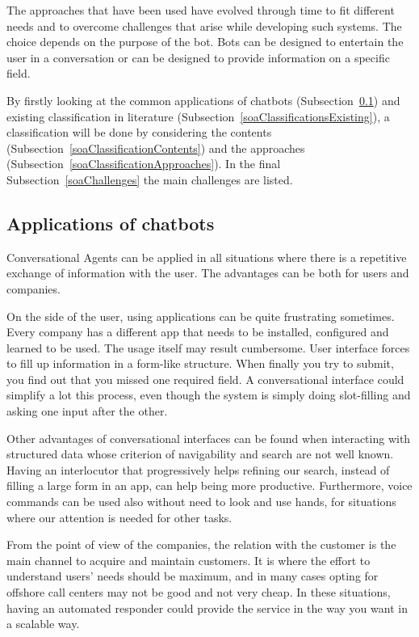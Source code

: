 The approaches that have been used have evolved through time to fit different needs and to overcome challenges that arise while developing such systems. The choice depends on the purpose of the bot. Bots can be designed to entertain the user in a conversation or can be designed to provide information on a specific field.

By firstly looking at the common applications of chatbots (Subsection~\ref{soaApplications}) and existing classification in literature (Subsection~\ref{soaClassificationsExisting}), a classification will be done by considering the contents (Subsection~\ref{soaClassificationContents}) and the approaches (Subsection~\ref{soaClassificationApproaches}). In the final Subsection~\ref{soaChallenges} the main challenges are listed.

\subsection{Applications of chatbots}
\label{soaApplications}

Conversational Agents can be applied in all situations where there is a repetitive exchange of information with the user. The advantages can be both for users and companies.

On the side of the user, using applications can be quite frustrating sometimes. Every company has a different app that needs to be installed, configured and learned to be used. The usage itself may result cumbersome. User interface forces to fill up information in a form-like structure. When finally you try to submit, you find out that you missed one required field. A conversational interface could simplify a lot this process, even though the system is simply doing slot-filling and asking one input after the other.

Other advantages of conversational interfaces can be found when interacting with structured data whose criterion of navigability and search are not well known. Having an interlocutor that progressively helps refining our search, instead of filling a large form in an app, can help being more productive. Furthermore, voice commands can be used also without need to look and use hands, for situations where our attention is needed for other tasks.

From the point of view of the companies, the relation with the customer is the main channel to acquire and maintain customers. It is where the effort to understand users' needs should be maximum, and in many cases opting for offshore call centers may not be good and not very cheap. In these situations, having an automated responder could provide the service in the way you want in a scalable way.

